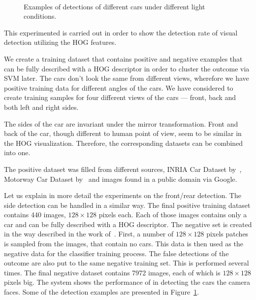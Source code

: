 \begin{figure}[p]
\\
\caption{Examples of detections of different cars under different light conditions.}
\label{fig:detection_examples}
\end{figure}

This experimented is carried out in order to show the detection rate of visual
detection utilizing the HOG features.

We create a training dataset that contains positive and negative examples that
can be fully described with a HOG descriptor in order to cluster the outcome
via SVM later. The cars don't look the same from different views, wherefore we
have positive training data for different angles of the cars. We have
considered to create training samples for four different views of the cars ---
front, back and both left and right sides.

The sides of the car are invariant under the mirror transformation. Front and
back of the car, though different to human point of view, seem to be similar
in the HOG visualization. Therefore, the corresponding datasets can be
combined into one.

The positive dataset was filled from different sources, INRIA Car Dataset
by~\cite{inriadata}, Motorway Car Dataset by~\cite{TMEMotorwayDataset} and
images found in a public domain via Google.

Let us explain in more detail the experiments on the front/rear detection. The
side detection can be handled in a similar way. The final positive training
dataset contains 440 images, $128 \times 128$ pixels each. Each of those
images contains only a car and can be fully described with a HOG descriptor.
The negative set is created in the way described in the work
of~\cite{dalal2005}. First, a number of $128 \times 128$ pixels patches is
sampled from the images, that contain no cars. This data is then used as the
negative data for the classifier training process. The false detections of the
outcome are also put to the same negative training set. This is performed
several times. The final negative dataset contains 7972 images, each of which
is $128 \times 128$ pixels big. The system shows the performance of  in detecting the cars the camera faces. Some
of the detection examples are presented in
Figure~\ref{fig:detection_examples}.

